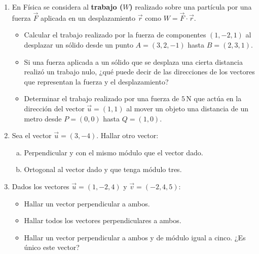 \documentclass[11pt]{article}
\begin{document}
\begin{enumerate}[\hspace{-3mm}$1)$]
    

\item En Física se considera al {\bf trabajo ($W$)} realizado sobre una partícula por una fuerza $\vec{F}$ aplicada en un desplazamiento $\vec{r}$ como $W = \vec{F} \cdot \vec{r}$.

    \begin{itemize}
        \item[a)] Calcular el trabajo realizado por la fuerza de componentes $(1, -2, 1)$ al desplazar un sólido desde un punto $A = (3, 2, -1)$ hasta $B = (2, 3, 1)$.
        \item[b)] Si una fuerza aplicada a un sólido que se desplaza una cierta distancia realizó un trabajo nulo, ¿qué puede decir de las direcciones de los vectores que representan la fuerza y el desplazamiento?
        \item[c)] Determinar el trabajo realizado por una fuerza de $5\,\text{N}$ que actúa en la dirección del vector $\vec{u} = (1, 1)$ al mover un objeto una distancia de un metro desde $P = (0, 0)$ hasta $Q = (1, 0)$.
    \end{itemize}







\item Sea el vector $\vec{u} = (3, -4)$. Hallar otro vector:

    \begin{enumerate}[a) ]
        \item Perpendicular y con el mismo módulo que el vector dado.
        \item Ortogonal al vector dado y que tenga módulo tres.
    \end{enumerate}











    

\item Dados los vectores $\vec{u} = (1, -2, 4)$ y $\vec{v} = (-2, 4, 5)$:

    \begin{itemize}
        \item[a)] Hallar un vector perpendicular a ambos.
        \item[b)] Hallar todos los vectores perpendiculares a ambos.
        \item[c)] Hallar un vector perpendicular a ambos y de módulo igual a cinco. ¿Es único este vector?
    \end{itemize}










\end{enumerate}
\end{document}
